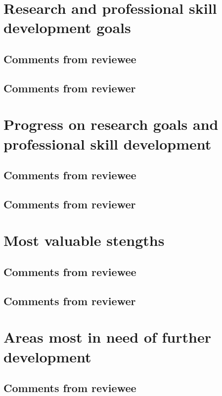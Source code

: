 \documentclass[10pt]{article}
\begin{document}
\section*{Research and professional skill development goals}
\subsection*{Comments from reviewee}

\subsection*{Comments from reviewer}

\section*{Progress on research goals and professional skill development}
\subsection*{Comments from reviewee}

\subsection*{Comments from reviewer}

\section*{Most valuable stengths}
\subsection*{Comments from reviewee}

\subsection*{Comments from reviewer}

\section*{Areas most in need of further development}
\subsection*{Comments from reviewee}
\end{document}
